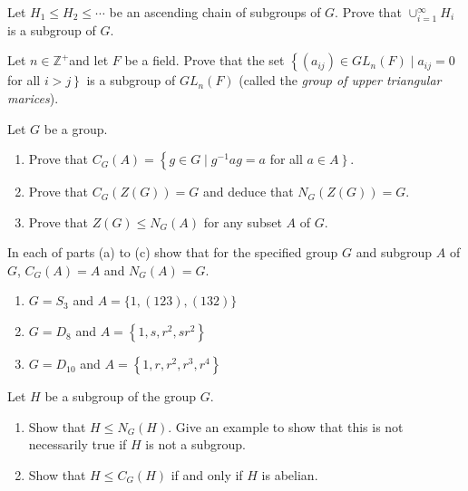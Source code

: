 \documentclass[
    11pt,a4paper,
]{exam}
\begin{document}
\begin{questions}
    
    
    
    \question
    Let \(H_1 \leq H_2 \leq \cdots\) be an ascending chain of subgroups of \(G\). Prove that \(\cup_{i=1}^{\infty} H_i\) is a subgroup of \(G\).
    
    \question
    Let \(n \in \mathbb{Z}^{+}\)and let \(F\) be a field. Prove that the set \(\left\{\left(a_{i j}\right) \in G L_n(F) \mid a_{i j}=0\right.\) for all \(\left.i>j\right\}\) is a subgroup of \(G L_n(F)\) (called the \textit{group of upper triangular marices}).
    
    
    
    \question Let \(G\) be a group.\hfill
    \begin{enumerate}[label=(\roman*)]
        \item Prove that \(C_G(A)=\left\{g \in G \mid g^{-1} a g=a\right.\) for all \(\left.a \in A\right\}\).
        \item Prove that \(C_G(Z(G))=G\) and deduce that \(N_G(Z(G))=G\).
        \item Prove that \(Z(G) \leq N_G(A)\) for any subset \(A\) of \(G\).
    \end{enumerate}
    
     
    
    
    \question
    In each of parts (a) to (c) show that for the specified group \(G\) and subgroup \(A\) of \(G\), \(C_G(A)=A\) and \(N_G(A)=G\).
    \begin{enumerate}[label=(\alph*)]
        \item \(G=S_3\) and \(A=\{1,(123),(132)\}\)
        \item \(G=D_8\) and \(A=\left\{1, s, r^2, s r^2\right\}\)
        \item \(G=D_{10}\) and \(A=\left\{1, r, r^2, r^3, r^4\right\}\)
    \end{enumerate}
    
    
    
    \question Let \(H\) be a subgroup of the group \(G\).
    \begin{enumerate}[label=(\alph*)]
        \item Show that \(H \leq N_G(H)\). Give an example to show that this is not necessarily true if \(H\) is not a subgroup.
        \item Show that \(H \leq C_G(H)\) if and only if \(H\) is abelian.
    \end{enumerate}
    
    
    
     
    
    \end{questions}
\end{document}
